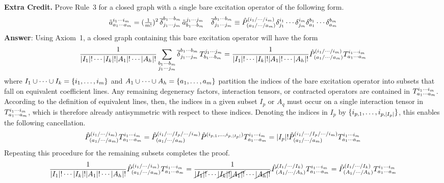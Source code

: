 \documentclass[11pt]{article}
\begin{document}
\newpage
\noindent
\textbf{Extra Credit.}
Prove Rule~3 for a closed graph with a single bare excitation operator of the following form.
\begin{align*}
  \tilde{a}^{i_1\cdots i_m}_{a_1\cdots a_m}
=
  (\tfrac{1}{m!})^2\,
  \overline{\delta }_{j_1\cdots j_m}^{b_1\cdots b_m}\,
  \tilde{a}^{j_1\cdots j_m}_{b_1\cdots b_m}
&&
  \overline{\delta }_{j_1\cdots j_m}^{b_1\cdots b_m}
\equiv
  \hat{P}_{(a_1/\cdots/a_m)}^{(i_1/\cdots/i_m)}
  \delta _{j_1}^{i_1}
  \cdots
  \delta _{j_m}^{i_m}
  \delta _{a_1}^{b_1}
  \cdots
  \delta _{a_m}^{b_m}
\end{align*}
\textbf{Answer}:
Using Axiom~1, a closed graph containing this bare excitation operator will have the form
\begin{align*}
  \frac {1}{
    |I_1|!\cdots|I_k|!
    |A_1|!\cdots|A_h|!
  }
  \sum_{\substack{b_1\cdots b_m\\j_1\cdots j_m}}
  \overline{\delta }_{j_1\cdots j_m}^{b_1\cdots b_m}\,
  T_{b_1\cdots b_m}^{j_1\cdots j_m}
=
  \frac {1}{
    |I_1|!\cdots|I_k|!
    |A_1|!\cdots|A_h|!
  }
  \hat{P}_{(a_1/\cdots/a_m)}^{(i_1/\cdots/i_m)}
  T_{a_1\cdots a_m}^{i_1\cdots i_m}
\end{align*}
where $I_1\cup\cdots\cup I_k=\{i_1,\ldots, i_m\}$ and $A_1\cup\cdots\cup A_h=\{a_1,\ldots,a_m\}$ partition the indices of the bare excitation operator into subsets that fall on equivalent coefficient lines.
Any remaining degeneracy factors, interaction tensors, or contracted operators are contained in
$
  T_{a_1\cdots a_m}^{i_1\cdots i_m}
$.
According to the definition of equivalent lines, then, the indices in a given subset $I_p$ or $A_q$ must occur on a single interaction tensor in $T_{a_1\cdots a_m}^{i_1\cdots i_m}$, which is therefore already antisymmetric with respect to these indices.
Denoting the indices in $I_p$ by $\{i_{p,1},\ldots,i_{p,|I_p|}\}$, this enables the following cancellation.
\begin{align*}
  \hat{P}_{(a_1/\cdots/a_m)}^{(i_1/\cdots/i_m)}
  T_{a_1\cdots a_m}^{i_1\cdots i_m}
=
  \hat{P}_{(a_1/\cdots/a_m)}^{(i_1/\cdots/I_p/\cdots/i_m)}
  \hat{P}^{(i_{p,1},\ldots,i_{p,|I_p|})}
  T_{a_1\cdots a_m}^{i_1\cdots i_m}
=
  |I_p|!
  \hat{P}_{(a_1/\cdots/a_m)}^{(i_1/\cdots/I_p/\cdots/i_m)}
  T_{a_1\cdots a_m}^{i_1\cdots i_m}
\end{align*}
Repeating this procedure for the remaining subsets completes the proof.
\begin{align*}
  \frac {1}{
    |I_1|!\cdots|I_k|!
    |A_1|!\cdots|A_h|!
  }
  \hat{P}_{(a_1/\cdots/a_m)}^{(i_1/\cdots/i_m)}
  T_{a_1\cdots a_m}^{i_1\cdots i_m}
=
  \frac {1}{
    \cancel{|I_1|!}\cdots\cancel{|I_k|!}
    \cancel{|A_1|!}\cdots\cancel{|A_h|!}
  }
  \hat{P}_{(A_1/\cdots/A_h)}^{(I_1/\cdots/I_k)}
  T_{a_1\cdots a_m}^{i_1\cdots i_m}
=
  \hat{P}_{(A_1/\cdots/A_h)}^{(I_1/\cdots/I_k)}
  T_{a_1\cdots a_m}^{i_1\cdots i_m}
\end{align*}
\end{document}
